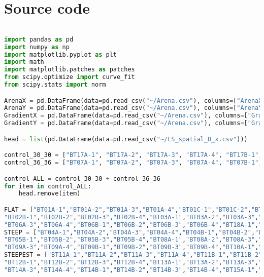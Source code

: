 \chapter{Source code}
\label{cha:Appendix}

\begin{lstlisting}[language=Python, basicstyle=\tiny, frame=single, keywordstyle=\color{teal}, commentstyle=\color{olive}, stringstyle=\color{red}]

import pandas as pd
import numpy as np
import matplotlib.pyplot as plt
import math
import matplotlib.patches as patches
from scipy.optimize import curve_fit
from scipy.stats import norm

ArenaX = pd.DataFrame(data=pd.read_csv("~/Arena.csv"), columns=["ArenaX"])
ArenaY = pd.DataFrame(data=pd.read_csv("~/Arena.csv"), columns=["ArenaY"])
GradientX = pd.DataFrame(data=pd.read_csv("~/Arena.csv"), columns=["GradX"])
GradientY = pd.DataFrame(data=pd.read_csv("~/Arena.csv"), columns=["GradY"])

head = list(pd.DataFrame(data=pd.read_csv("~/LS_spatial_D_x.csv")))

control_30_30 = ["BT17A-1", "BT17A-2", "BT17A-3", "BT17A-4", "BT17B-1", "BT17B-2", "BT17B-3", "BT17B-4"]
control_36_36 = ["BT07A-1", "BT07A-2", "BT07A-3", "BT07A-4", "BT07B-1", "BT07B-2", "BT07B-3", "BT07B-4"]

control_ALL = control_30_30 + control_36_36
for item in control_ALL:
    head.remove(item)

FLAT = ["BT01A-1","BT01A-2","BT01A-3","BT01A-4","BT01C-1","BT01C-2","BT01C-3","BT01C-4","BT02A-1","BT02A-2","BT02A-3","BT02A-4",
"BT02B-1","BT02B-2","BT02B-3","BT02B-4","BT03A-1","BT03A-2","BT03A-3","BT03A-4","BT03B-1","BT03B-2","BT03B-3","BT03B-4","BT06A-1","BT06A-2",
"BT06A-3","BT06A-4","BT06B-1","BT06B-2","BT06B-3","BT06B-4","BT18A-1","BT18A-2","BT18A-3","BT18A-4","BT18B-1","BT18B-2","BT18B-3","BT18B-4"]
STEEP = ["BT04A-1","BT04A-2","BT04A-3","BT04A-4","BT04B-1","BT04B-2","BT04B-3","BT04B-4","BT05A-1","BT05A-2","BT05A-3","BT05A-4",
"BT05B-1","BT05B-2","BT05B-3","BT05B-4","BT08A-1","BT08A-2","BT08A-3","BT08A-4","BT08B-1","BT08B-2","BT08B-3","BT08B-4","BT09A-1","BT09A-2",
"BT09A-3","BT09A-4","BT09B-1","BT09B-2","BT09B-3","BT09B-4","BT10A-1","BT10A-2","BT10A-3","BT10A-4","BT10B-1","BT10B-2","BT10B-3","BT10B-4"]
STEEPEST = ["BT11A-1","BT11A-2","BT11A-3","BT11A-4","BT11B-1","BT11B-2","BT11B-3","BT11B-4","BT12A-1","BT12A-2","BT12A-3","BT12A-4",
"BT12B-1","BT12B-2","BT12B-3","BT12B-4","BT13A-1","BT13A-2","BT13A-3","BT13A-4","BT13B-1","BT13B-2","BT13B-3","BT13B-4","BT14A-1","BT14A-2",
"BT14A-3","BT14A-4","BT14B-1","BT14B-2","BT14B-3","BT14B-4","BT15A-1","BT15A-2","BT15A-3","BT15A-4","BT15B-1","BT15B-2","BT15B-3","BT15B-4"]


\end{lstlisting}
